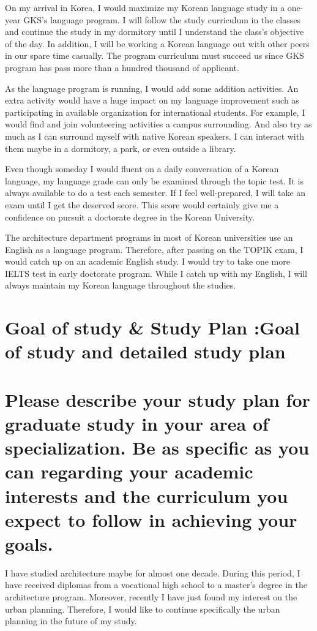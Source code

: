 \documentclass[12pt]{simart} %
\begin{document}
On my arrival in Korea, I would maximize my Korean language study in a one-year GKS's language program.
I will follow the study curriculum in the classes and continue the study in my dormitory until I understand the class's objective of the day.
In addition, I will be working a Korean language out with other peers in our spare time casually.
The program curriculum must succeed us since GKS program has pass more than a hundred thousand of applicant.

As the language program is running, I would add some addition activities. An extra activity would have a huge impact on my language improvement such as participating in available organization for international students.
For example, I would find and join volunteering activities a campus surrounding. And also try as much as I can surround myself with native Korean speakers. I can interact with them maybe in a dormitory, a park, or even outside a library.

Even though someday I would fluent on a daily conversation of a Korean language, my language grade can only be examined through the topic test. It is always available to do a test each semester. If I feel well-prepared, I will take an exam until I get the deserved score. This score would certainly give me a confidence on pursuit a doctorate degree in the Korean University.

The architecture department programs in most of Korean universities use an English as a language program. Therefore, after passing on the TOPIK exam, I would catch up on an academic English study. I would try to take one more IELTS test in early doctorate program. While I catch up with my English, I will always maintain my Korean language throughout the studies.


\section{Goal of study \& Study Plan :Goal of study and detailed study plan}
\section*{Please describe your study plan for graduate study in your area of specialization. Be as specific as you can regarding your academic interests and the curriculum you expect to follow in achieving your goals.}

I have studied architecture maybe for almost one decade. During this period, I have received diplomas from a vocational high school to a master's degree in the architecture program.
Moreover, recently I have just found my interest on the urban planning. Therefore, I would like to continue specifically the urban planning in the future of my study.
\end{document}
